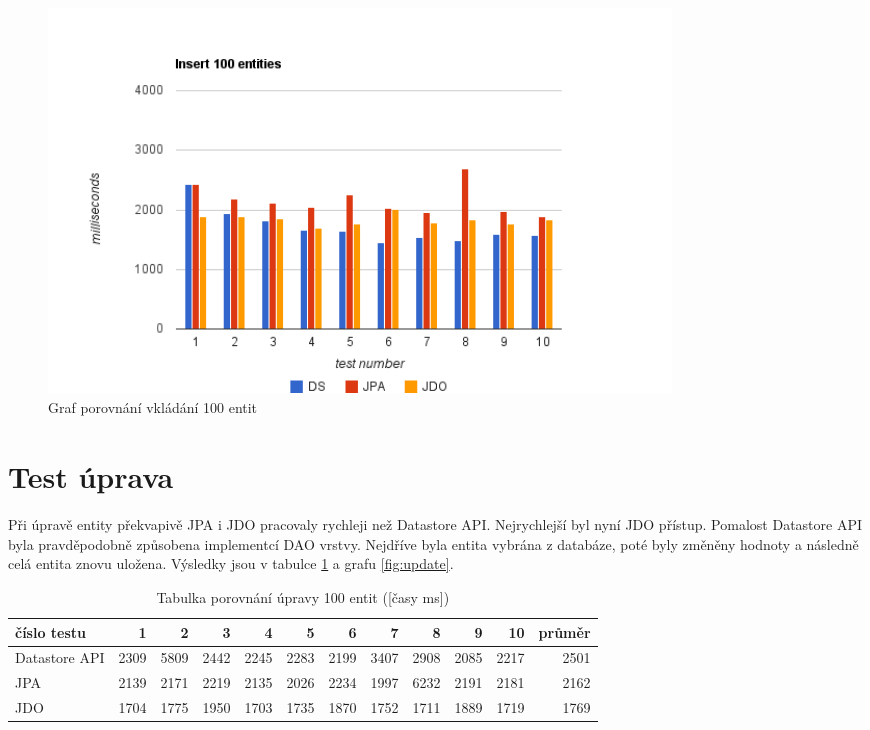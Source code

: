 \begin{figure}[h]
\begin{center}
\includegraphics[width=6.5in]{figures/insert.png}
\caption{Graf porovnání vkládání 100 entit}
\label{fig:insert}
\end{center}
\end{figure}

\section{Test úprava}

Při úpravě entity překvapivě JPA i JDO pracovaly rychleji než Datastore API. Nejrychlejší byl nyní JDO přístup. Pomalost Datastore API byla pravděpodobně způsobena implementcí DAO vrstvy. Nejdříve byla entita vybrána z databáze, poté byly změněny hodnoty a následně celá entita znovu uložena. Výsledky jsou v tabulce \ref{tab:update} a grafu \ref{fig:update}.

\begin{table}[h]
\centering
\caption{Tabulka porovnání úpravy 100 entit  ([časy ms])}\label{tab:update}
\begin{tabular}{|l|r|r|r|r|r|r|r|r|r|r|r|}
   \hline
číslo testu	& 1		& 2		& 3		& 4		& 5		& 6		& 7		& 8		& 9		& 10		& průměr \\
   \hline
Datastore API	& 2309	& 5809	& 2442	& 2245	& 2283	& 2199	& 3407	& 2908	& 2085	& 2217	& 2501 \\
JPA	& 2139	& 2171	& 2219	& 2135	& 2026	& 2234	& 1997	& 6232	& 2191	& 2181	& 2162 \\
JDO	& 1704	& 1775	& 1950	& 1703	& 1735	& 1870	& 1752	& 1711	& 1889	& 1719	& 1769 \\
   \hline
\end{tabular}
\end{table}

